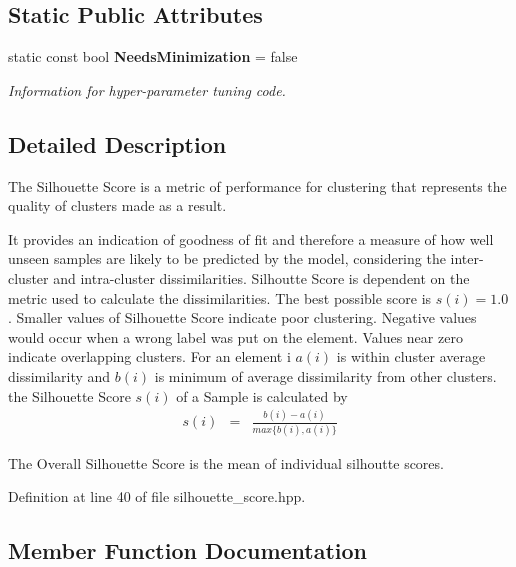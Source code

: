 \subsection*{Static Public Attributes}
\begin{DoxyCompactItemize}
\item 
static const bool \textbf{ Needs\+Minimization} = false
\begin{DoxyCompactList}\small\item\em Information for hyper-\/parameter tuning code. \end{DoxyCompactList}\end{DoxyCompactItemize}


\subsection{Detailed Description}
The Silhouette Score is a metric of performance for clustering that represents the quality of clusters made as a result. 

It provides an indication of goodness of fit and therefore a measure of how well unseen samples are likely to be predicted by the model, considering the inter-\/cluster and intra-\/cluster dissimilarities. Silhoutte Score is dependent on the metric used to calculate the dissimilarities. The best possible score is $ s(i) = 1.0 $. Smaller values of Silhouette Score indicate poor clustering. Negative values would occur when a wrong label was put on the element. Values near zero indicate overlapping clusters. For an element i $ a(i) $ is within cluster average dissimilarity and $ b(i) $ is minimum of average dissimilarity from other clusters. the Silhouette Score $ s(i) $ of a Sample is calculated by \begin{eqnarray*} s(i) &=& \frac{b(i) - a(i)}{max\{b(i), a(i)\}} \end{eqnarray*}

The Overall Silhouette Score is the mean of individual silhoutte scores. 

Definition at line 40 of file silhouette\+\_\+score.\+hpp.



\subsection{Member Function Documentation}
\mbox{\label{classmlpack_1_1cv_1_1SilhouetteScore_afae80ee0a051c84c8f98628ef047bb65}} 
